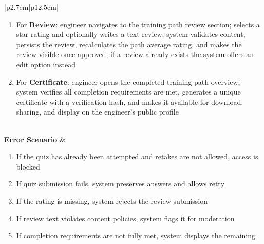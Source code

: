 \begin{table}[H]
\begin{tabular}{|p{2.7cm}|p{12.5cm}|}
\begin{minipage}[t]{\linewidth}
\begin{enumerate}[topsep=0pt,itemsep=1pt,parsep=0pt,partopsep=0pt]
                                              \item For \textbf{Review}: engineer navigates to the training path review section;
                                                    selects a star rating and optionally writes a text review; system validates
                                                    content, persists the review, recalculates the path average rating, and makes
                                                    the review visible once approved; if a review already exists the system offers
                                                    an edit option instead
                                              \item For \textbf{Certificate}: engineer opens the completed training path overview;
                                                    system verifies all completion requirements are met, generates a unique
                                                    certificate with a verification hash, and makes it available for download,
                                                    sharing, and display on the engineer's public profile
                                          \end{enumerate}
                                      \end{minipage}                                                                                    \\
            \hline
            \textbf{Error Scenario} & \begin{minipage}[t]{\linewidth}
                                          \begin{enumerate}[topsep=0pt,itemsep=1pt,parsep=0pt,partopsep=0pt]
                                              \item If the quiz has already been attempted and retakes are not allowed, access is
                                                    blocked
                                              \item If quiz submission fails, system preserves answers and allows retry
                                              \item If the rating is missing, system rejects the review submission
                                              \item If review text violates content policies, system flags it for moderation
                                              \item If completion requirements are not fully met, system displays the remaining

\end{enumerate}
\end{minipage}
\end{tabular}
\end{table}
